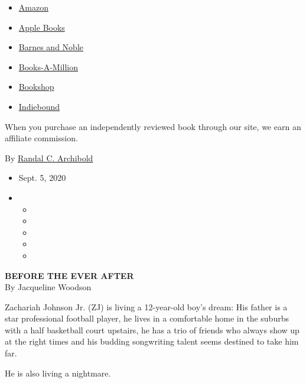 \begin{itemize}
\tightlist
\item
  \href{https://www.amazon.com/gp/search?index=books\&tag=NYTBSREV-20\&field-keywords=Before+the+Ever+After+Jacqueline+Woodson}{Amazon}
\item
  \href{https://du-gae-books-dot-nyt-du-prd.appspot.com/buy?title=Before+the+Ever+After\&author=Jacqueline+Woodson}{Apple
  Books}
\item
  \href{https://www.anrdoezrs.net/click-7990613-11819508?url=https\%3A\%2F\%2Fwww.barnesandnoble.com\%2Fw\%2F\%3Fean\%3D9780399545436}{Barnes
  and Noble}
\item
  \href{https://www.anrdoezrs.net/click-7990613-35140?url=https\%3A\%2F\%2Fwww.booksamillion.com\%2Fp\%2FBefore\%2Bthe\%2BEver\%2BAfter\%2FJacqueline\%2BWoodson\%2F9780399545436}{Books-A-Million}
\item
  \href{https://bookshop.org/a/3546/9780399545436}{Bookshop}
\item
  \href{https://www.indiebound.org/book/9780399545436?aff=NYT}{Indiebound}
\end{itemize}

When you purchase an independently reviewed book through our site, we
earn an affiliate commission.

By
\href{https://www.nytimes3xbfgragh.onion/by/randal-c-archibold}{Randal
C. Archibold}

\begin{itemize}
\item
  Sept. 5, 2020
\item
  \begin{itemize}
  \item
  \item
  \item
  \item
  \item
  \end{itemize}
\end{itemize}

\textbf{BEFORE THE EVER AFTER}\\
By Jacqueline Woodson

Zachariah Johnson Jr. (ZJ) is living a 12-year-old boy's dream: His
father is a star professional football player, he lives in a comfortable
home in the suburbs with a half basketball court upstairs, he has a trio
of friends who always show up at the right times and his budding
songwriting talent seems destined to take him far.

He is also living a nightmare.

